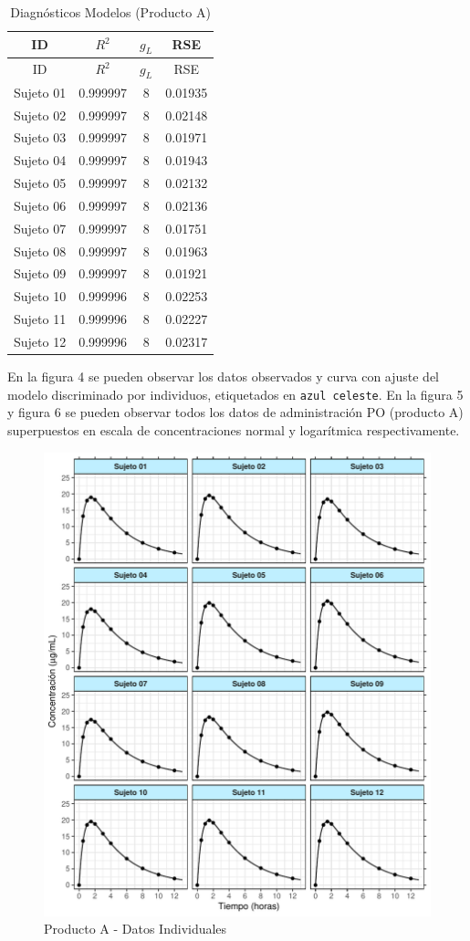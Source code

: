\documentclass[]{article}
\begin{document}
\begin{longtable}[]{@{}cccc@{}}
\caption{Diagnósticos Modelos (Producto A)}\tabularnewline
\toprule
ID & \(R^{2}\) & \(g_{L}\) & RSE\tabularnewline
\midrule
\endfirsthead
\toprule
ID & \(R^{2}\) & \(g_{L}\) & RSE\tabularnewline
\midrule
\endhead
Sujeto 01 & 0.999997 & 8 & 0.01935\tabularnewline
Sujeto 02 & 0.999997 & 8 & 0.02148\tabularnewline
Sujeto 03 & 0.999997 & 8 & 0.01971\tabularnewline
Sujeto 04 & 0.999997 & 8 & 0.01943\tabularnewline
Sujeto 05 & 0.999997 & 8 & 0.02132\tabularnewline
Sujeto 06 & 0.999997 & 8 & 0.02136\tabularnewline
Sujeto 07 & 0.999997 & 8 & 0.01751\tabularnewline
Sujeto 08 & 0.999997 & 8 & 0.01963\tabularnewline
Sujeto 09 & 0.999997 & 8 & 0.01921\tabularnewline
Sujeto 10 & 0.999996 & 8 & 0.02253\tabularnewline
Sujeto 11 & 0.999996 & 8 & 0.02227\tabularnewline
Sujeto 12 & 0.999996 & 8 & 0.02317\tabularnewline
\bottomrule
\end{longtable}

En la figura 4 se pueden observar los datos observados y curva con
ajuste del modelo discriminado por individuos, etiquetados en
\texttt{azul\ celeste}. En la figura 5 y figura 6 se pueden observar
todos los datos de administración PO (producto A) superpuestos en escala
de concentraciones normal y logarítmica respectivamente.

\begin{figure}[H]

{\centering \includegraphics{parcial_1_files/figure-latex/unnamed-chunk-10-1} 

}

\caption{Producto A - Datos Individuales}\label{fig:unnamed-chunk-10}
\end{figure}
\end{document}
